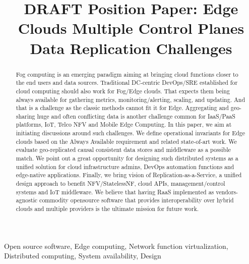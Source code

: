 \documentclass[conference]{IEEEtran}
\begin{document}
\title{DRAFT Position Paper: Edge Clouds Multiple Control Planes Data Replication
Challenges\\
}

\author{
\IEEEauthorblockA{\textit{} \\
\textit{}\\
\\
}
}

\maketitle

\begin{abstract}
Fog computing is an emerging paradigm aiming at bringing cloud functions closer
to the end users and data sources. Traditional DC-centric DevOps/SRE
established for cloud computing should also work for Fog/Edge clouds. That
expects them being always available for gathering metrics, monitoring/alerting,
scaling, and updating. And that is a challenge as the classic methods cannot
fit it for Edge. Aggregating and geo-sharing huge and often conflicting data is
another challenge common for IaaS/PaaS platforms, IoT, Telco NFV and Mobile
Edge Computing. In this paper, we aim at initiating discussions around such
challenges. We define operational invariants for Edge clouds based on the
Always Available requirement and related state-of-art work. We evaluate
geo-replicated causal consistent data stores and middleware as a possible
match. We point out a great opportunity for designing such distributed systems
as a unified solution for cloud infrastructure admins, DevOps automation
functions and edge-native applications. Finally, we bring vision of
Replication-as-a-Service, a unified design approach to benefit NFV/StatelessNF,
cloud APIs, management/control systems and IoT middleware. We believe that
having RaaS implemented as vendors-agnostic commodity opensource software that
provides interoperability over hybrid clouds and multiple providers is the
ultimate mission for future work.
\end{abstract}

\begin{IEEEkeywords}
Open source software, Edge computing, Network function virtualization,
Distributed computing, System availability, Design
\end{IEEEkeywords}
\end{document}
